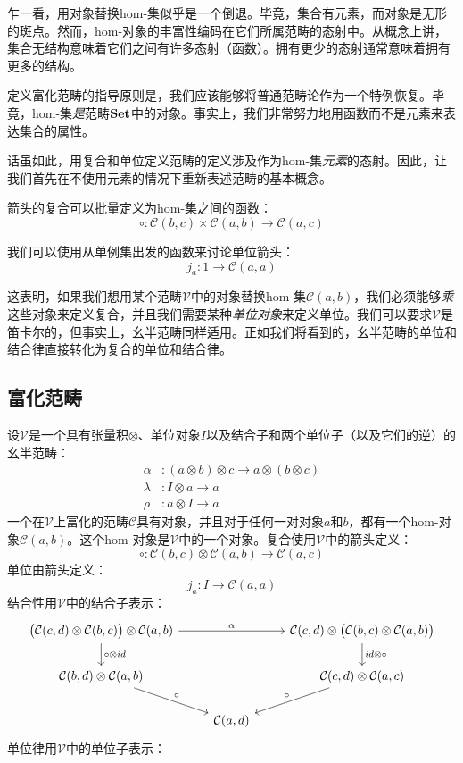 \documentclass[DaoFP]{subfiles}
\begin{document}
乍一看，用对象替换hom-集似乎是一个倒退。毕竟，集合有元素，而对象是无形的斑点。然而，hom-对象的丰富性编码在它们所属范畴的态射中。从概念上讲，集合无结构意味着它们之间有许多态射（函数）。拥有更少的态射通常意味着拥有更多的结构。

定义富化范畴的指导原则是，我们应该能够将普通范畴论作为一个特例恢复。毕竟，hom-集\emph{是}范畴$\mathbf{Set}$中的对象。事实上，我们非常努力地用函数而不是元素来表达集合的属性。

话虽如此，用复合和单位定义范畴的定义涉及作为hom-集\emph{元素}的态射。因此，让我们首先在不使用元素的情况下重新表述范畴的基本概念。

箭头的复合可以批量定义为hom-集之间的函数：
\[ \circ \colon \mathcal C (b, c) \times \mathcal C (a, b) \to \mathcal C (a, c) \]

我们可以使用从单例集出发的函数来讨论单位箭头：
\[ j_a \colon 1 \to \mathcal C (a, a) \]

这表明，如果我们想用某个范畴$\mathcal V$中的对象替换hom-集$\mathcal C (a, b)$，我们必须能够\emph{乘}这些对象来定义复合，并且我们需要某种\emph{单位对象}来定义单位。我们可以要求$\mathcal V$是笛卡尔的，但事实上，幺半范畴同样适用。正如我们将看到的，幺半范畴的单位和结合律直接转化为复合的单位和结合律。

\subsection{富化范畴}

设$\mathcal V$是一个具有张量积$\otimes$、单位对象$I$以及结合子和两个单位子（以及它们的逆）的幺半范畴：
\begin{align*}
\alpha &\colon (a \otimes b) \otimes c \to a \otimes (b \otimes c)
\\
 \lambda &\colon I \otimes a \to a
 \\
 \rho &\colon a \otimes I \to a
\end{align*}
一个在$\mathcal V$上富化的范畴$\mathcal C$具有对象，并且对于任何一对对象$a$和$b$，都有一个hom-对象$\mathcal C(a, b)$。这个hom-对象是$\mathcal V$中的一个对象。复合使用$\mathcal V$中的箭头定义：
\[ \circ \colon \mathcal C (b, c) \otimes \mathcal C (a, b) \to \mathcal C (a, c) \]
单位由箭头定义：
\[ j_a \colon I \to \mathcal C (a, a) \]
结合性用$\mathcal V$中的结合子表示：
\[
 \begin{tikzcd}
 \big( \mathcal C (c, d) \otimes \mathcal C (b, c) \big) \otimes \mathcal C(a, b)
 \arrow[rr, "\alpha"]
 \arrow[d, "\circ \otimes id"]
 &&  \mathcal C (c, d) \otimes \big( \mathcal C (b, c) \otimes \mathcal C(a, b) \big) 
 \arrow[d, "id \otimes \circ"]
 \\
 \mathcal C(b, d) \otimes \mathcal C(a, b)
 \arrow[dr, "\circ"]
 && \mathcal C(c, d) \otimes \mathcal C(a, c)
 \arrow[dl, "\circ"']
 \\
 & \mathcal C(a, d)
 \end{tikzcd}
\]
单位律用$\mathcal V$中的单位子表示：
\end{document}
